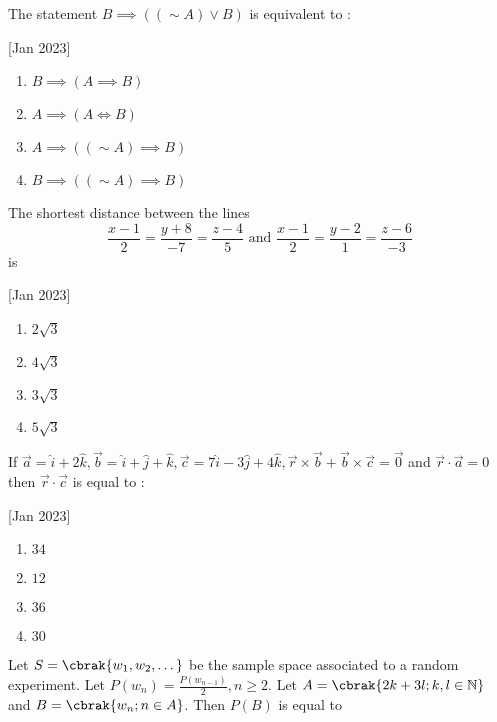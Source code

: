 \iffalse
\title{2023}
\author{EE24BTECH11019}
\section{mcq-single}
\fi

    \item The statement $B\implies((\sim A)\lor B)$ is equivalent to :
    
    \hfill[Jan 2023]
        \begin{enumerate}
            \item $B\implies(A \implies B)$
            \item $A \implies(A \iff B)$
            \item $A \implies((\sim A)\implies B)$
            \item $B \implies((\sim A)\implies B)$
        \end{enumerate}
    
    \item The shortest distance between the lines $$\frac{x-1}{2}=\frac{y+8}{-7}=\frac{z-4}{5} \text{ and } \frac{x-1}{2}=\frac{y-2}{1}=\frac{z-6}{-3}$$ is
    
    \hfill[Jan 2023]
        \begin{enumerate}
            \item $2\sqrt{3}$
            \item $4\sqrt{3}$
            \item $3\sqrt{3}$
            \item $5\sqrt{3}$
        \end{enumerate}
    
    \item If $\vec{a}=\hat{i}+2\hat{k},\vec{b}=\hat{i}+\hat{j}+\hat{k},\vec{c}=7\hat{i}-3\hat{j}+4\hat{k},\vec{r}\times\vec{b}+\vec{b}\times\vec{c}=\vec{0}$ and $\vec{r}\cdot\vec{a}=0$ then $\vec{r}\cdot\vec{c}$ is equal to :
    
    \hfill[Jan 2023]
        \begin{enumerate}
            \item $34$
            \item $12$
            \item $36$
            \item $30$
        \end{enumerate}

    \item Let $S=\cbrak{w_1,w_2,\dots}$ be the sample space associated to a random experiment. Let $P(w_n)=\frac{P(w_{n-1})}{2},n\geq2$. Let $A=\cbrak{2k+3l;k,l\in \mathbb{N}}$ and $B=\cbrak{w_n;n\in A}$. Then $P(B)$ is equal to
    
